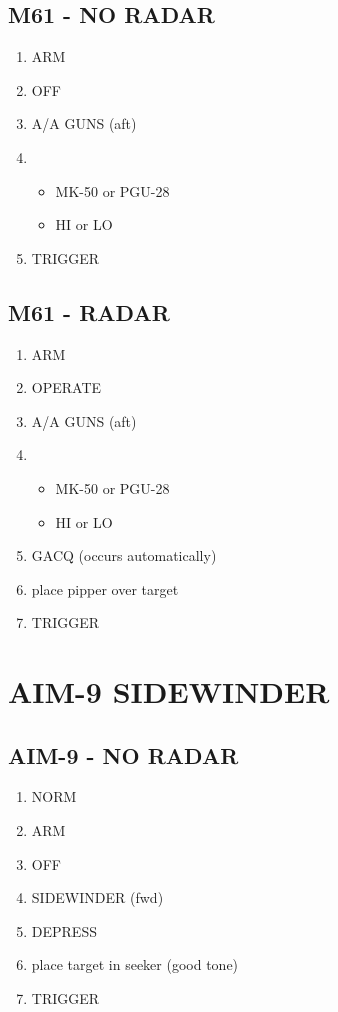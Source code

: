 \documentclass[fontInter]{TechCheck}
\begin{document}
	\subsection{M61 - NO RADAR}
	\begin{enumerate}
		\item {}\dotfill ARM
		\item {}\dotfill OFF
		\item {}\dotfill A/A GUNS (aft)
		\item {}
		\begin{itemize}
			\item {} MK-50 or PGU-28
			\item {} HI or LO
		\end{itemize}
		\item {}\dotfill TRIGGER
	\end{enumerate}

	\subsection{M61 - RADAR}
	\begin{enumerate}
		\item {}\dotfill ARM
		\item {}\dotfill OPERATE
		\item {}\dotfill A/A GUNS (aft)
		\item {}
		\begin{itemize}
			\item {} MK-50 or PGU-28
			\item {} HI or LO
		\end{itemize}
	\item {}\dotfill GACQ (occurs automatically)
	\item {}\dotfill place pipper over target
	\item {}\dotfill TRIGGER
	\end{enumerate}

	\section{AIM-9 SIDEWINDER}

	\subsection{AIM-9 - NO RADAR}
	\begin{enumerate}
		\item {}\dotfill NORM
		\item {}\dotfill ARM
		\item {}\dotfill OFF
		\item {}\dotfill SIDEWINDER (fwd)
		\item {}\dotfill DEPRESS
		\item {}\dotfill place target in seeker (good tone)
		\item {}\dotfill TRIGGER
	\end{enumerate}
\end{document}
